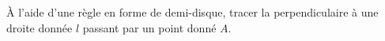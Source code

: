 À l'aide d'une règle en forme de demi-disque, tracer la perpendiculaire à une droite donnée $l$ passant par un point donné $A$.
